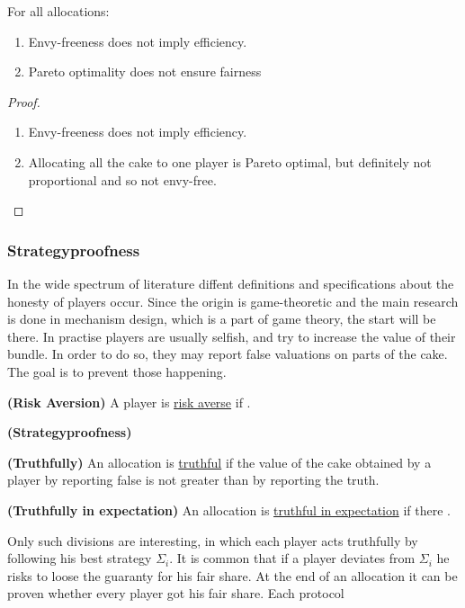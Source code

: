 \begin{lem}
For all allocations:
	\begin{enumerate}
		\item Envy-freeness does not imply efficiency.
		\item Pareto optimality does not ensure fairness
	\end{enumerate}
\end{lem}

\begin{proof}
	\begin{enumerate}
		\item Envy-freeness does not imply efficiency.
		\item Allocating all the cake to one player is Pareto optimal, but definitely not proportional and so not envy-free.
	\end{enumerate}
\end{proof}
\newpage

\subsubsection{Strategyproofness}
In the wide spectrum of literature diffent definitions and specifications about the honesty of players occur. Since the origin is game-theoretic and the main research is done in mechanism design, which is a part of game theory, the start will be there. In practise players are usually selfish, and try to increase the value of their bundle. In order to do so, they may report false valuations on parts of the cake. The goal is to prevent those happening.
\begin{defi}{\textbf{(Risk Aversion)}}
A player is \underline{risk averse} if .
\end{defi}

\begin{defi}{\textbf{(Strategyproofness)}}
\end{defi}

\begin{defi}{\textbf{(Truthfully)}}
An allocation is \underline{truthful} if the value of the cake obtained by a player by reporting false is not greater than by reporting the truth.
\end{defi}


\begin{defi}{\textbf{(Truthfully in expectation)}}
An allocation is \underline{truthful in expectation} if there .
\end{defi}

Only such divisions are interesting, in which each player acts truthfully by following his best strategy $\Sigma_{i}$.
%
It is common that if a player deviates from $\Sigma_{i}$ he risks to loose the guaranty for his fair share. At the end of an allocation it can be proven whether every player got his fair share. 
Each protocol 

